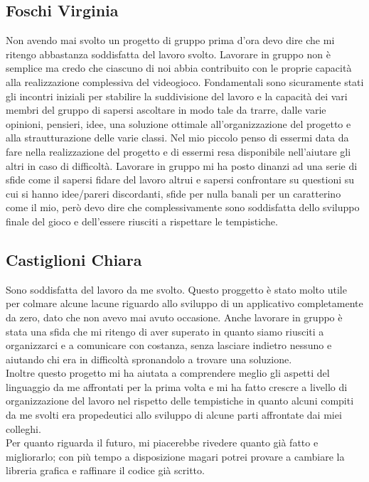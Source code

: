 \documentclass[a4paper,12pt]{report}
\begin{document}
\subsection{Foschi Virginia}
Non avendo mai svolto un progetto di gruppo prima d'ora devo dire che mi ritengo abbastanza soddisfatta del lavoro svolto. Lavorare in gruppo non è semplice ma credo che ciascuno di noi abbia contribuito con le proprie capacità alla realizzazione complessiva del videogioco.
Fondamentali sono sicuramente stati gli incontri iniziali per stabilire la suddivisione del lavoro e la capacità dei vari membri del gruppo di sapersi ascoltare in modo tale da trarre, dalle varie opinioni, pensieri, idee, una soluzione ottimale all'organizzazione del progetto e alla strautturazione delle varie classi.
Nel mio piccolo penso di essermi data da fare nella realizzazione del progetto e di essermi resa disponibile nell'aiutare gli altri in caso di difficoltà.
Lavorare in gruppo mi ha posto dinanzi ad una serie di sfide come il sapersi fidare del lavoro altrui e sapersi confrontare su questioni su cui si hanno idee/pareri discordanti, sfide per nulla banali per un caratterino come il mio, però devo dire che complessivamente sono soddisfatta dello sviluppo finale del gioco e dell'essere riusciti a rispettare le tempistiche.
\appendix
\subsection{Castiglioni Chiara}
Sono soddisfatta del lavoro da me svolto. Questo proggetto è stato molto utile per colmare alcune lacune riguardo allo sviluppo di un applicativo completamente da zero,
dato che non avevo mai avuto occasione. Anche lavorare in gruppo è stata una sfida che mi ritengo di aver superato in quanto siamo riusciti a organizzarci e a comunicare con
costanza, senza lasciare indietro nessuno e aiutando chi era in difficoltà spronandolo a trovare una soluzione.\\
Inoltre questo progetto mi ha aiutata a comprendere meglio gli aspetti del linguaggio da me affrontati per la prima volta e mi ha fatto crescre a livello di organizzazione del lavoro nel rispetto delle
tempistiche in quanto alcuni compiti da me svolti era propedeutici allo sviluppo di alcune parti affrontate dai miei colleghi.
\\Per quanto riguarda il futuro, mi piacerebbe rivedere quanto già fatto e migliorarlo; con più tempo a disposizione magari potrei provare a cambiare la libreria grafica e raffinare il codice già scritto.
\end{document}
